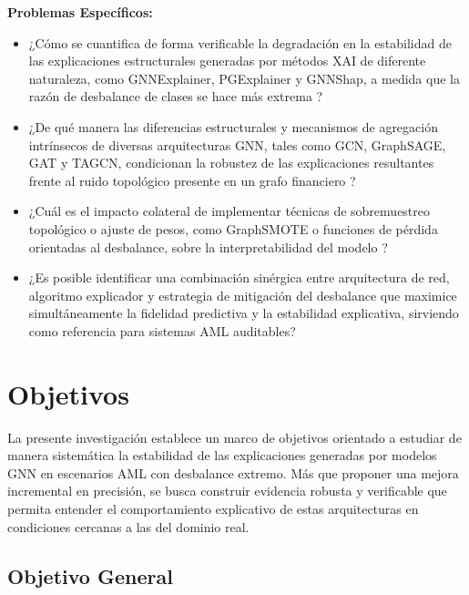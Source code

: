 \bigskip

\textbf{Problemas Específicos:}
\begin{itemize}
    \item ¿Cómo se cuantifica de forma verificable la degradación en la estabilidad de las explicaciones estructurales generadas por métodos XAI de diferente naturaleza, como GNNExplainer, PGExplainer y GNNShap, a medida que la razón de desbalance de clases se hace más extrema \cite{Ying2019Gnnexplainer:Networks, Luo2020ParameterizedNetwork, Akkas2024Gnnshap:Values}?
    \item ¿De qué manera las diferencias estructurales y mecanismos de agregación intrínsecos de diversas arquitecturas GNN, tales como GCN, GraphSAGE, GAT y TAGCN, condicionan la robustez de las explicaciones resultantes frente al ruido topológico presente en un grafo financiero \cite{Du2017TopologyNetworks, He2026AnDetection}?
    \item ¿Cuál es el impacto colateral de implementar técnicas de sobremuestreo topológico o ajuste de pesos, como GraphSMOTE o funciones de pérdida orientadas al desbalance, sobre la interpretabilidad del modelo \cite{Zhao2021Graphsmote:Networks}?
    \item ¿Es posible identificar una combinación sinérgica entre arquitectura de red, algoritmo explicador y estrategia de mitigación del desbalance que maximice simultáneamente la fidelidad predictiva y la estabilidad explicativa, sirviendo como referencia para sistemas AML auditables?
\end{itemize}

\bigskip

\section{Objetivos}

La presente investigación establece un marco de objetivos orientado a estudiar de manera sistemática la estabilidad de las explicaciones generadas por modelos GNN en escenarios AML con desbalance extremo. Más que proponer una mejora incremental en precisión, se busca construir evidencia robusta y verificable que permita entender el comportamiento explicativo de estas arquitecturas en condiciones cercanas a las del dominio real.

\subsection{Objetivo General}

